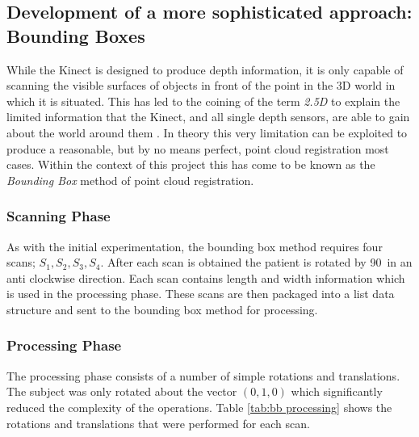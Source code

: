 \subsection{Development of a more sophisticated approach: Bounding Boxes} 
\label{design:bounding boxes}
\label{design:bounding box}
While the Kinect is designed to produce depth information, it is only capable of scanning the visible surfaces of objects in front of the point in the 3D world in which it is situated. This has led to the coining of the term \emph{2.5D} to explain the limited information that the Kinect, and all single depth sensors, are able to gain about the world around them \cite{lu2006}. In theory this very limitation can be exploited to produce a reasonable, but by no means perfect, point cloud registration most cases. Within the context of this project this has come to be known as the \emph{Bounding Box} method of point cloud registration. \\ 

\subsubsection{Scanning Phase}
As with the initial experimentation, the bounding box method requires four scans; $S_1, S_2, S_3, S_4$. After each scan is obtained the patient is rotated by 90\degree \ in an anti clockwise direction. Each scan contains length and width information which is used in the processing phase. These scans are then packaged into a list data structure and sent to the bounding box method for processing. \\

\subsubsection{Processing Phase}
The processing phase consists of a number of simple rotations and translations. The subject was only rotated about the vector $(0, 1, 0)$ which significantly reduced the complexity of the operations. Table \ref{tab:bb processing} shows the rotations and translations that were performed for each scan. \\

